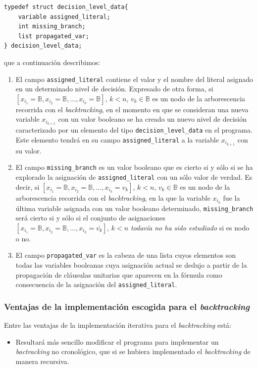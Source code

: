 \documentclass[12pt,lettersize,oneside]{article}
\begin{document}
\begin{lstlisting}
typedef struct decision_level_data{
    variable assigned_literal;
    int missing_branch;                                                
    list propagated_var;
} decision_level_data;
\end{lstlisting}
que a continuación describimos:
\vspace{-2.5mm}
\begin{enumerate}
\item El campo {\tt assigned\_literal} contiene el valor y el nombre del literal
  asignado en un determinado nivel de decisión. Expresado de otra forma,  si
  $[x_{i_1}=\mathbb{B},x_{i_2}=\mathbb{B},\ldots, x_{i_k} = \mathbb{B} ]$, $k< n$, $v_k
  \in \mathbb{B}$ es un nodo de la arborescencia recorrida con el
  \emph{backtracking}, en el momento en que se consideran una nueva variable
  $x_{i_{k+1}}$ con un valor booleano se ha creado un nuevo nivel de decisión
  caracterizado por un elemento del tipo {\tt decision\_level\_data} en el
  programa. Este elemento tendrá en su campo {\tt assigned\_literal} a la
  variable $x_{i_{k+1}}$ con su valor.
\item El campo {\tt missing\_branch} es un valor booleano que es cierto si y
  sólo si se ha explorado la asignación de {\tt assigned\_literal} con un
  sólo valor de verdad. Es decir, si
  $[x_{i_1}=\mathbb{B},x_{i_2}=\mathbb{B},\ldots, x_{i_k} = v_k ]$, $k< n$, $v_k
  \in \mathbb{B}$ es un nodo de la arborescencia recorrida con el
  \emph{backtracking}, en la que la variable $x_{i_k}$ fue la última variable
  asignada con un valor booleano determinado, {\tt missing\_branch} será cierto
  si y sólo si el conjunto de asignaciones
  $[x_{i_1}=\mathbb{B},x_{i_2}=\mathbb{B},\ldots, x_{i_k} = \overline{v_k} ]$,
  $k<n$ \emph{todavía no ha sido estudiado} si es nodo o no.
\item El campo {\tt propagated\_var} es la cabeza de una lista cuyos elementos
  son todas las variables booleanas cuya asignación actual se dedujo a partir de
  la propagación de cláusulas unitarias que aparecen en la fórmula como
  consecuencia de la asignación del {\tt assigned\_literal}.
\end{enumerate}

\subsubsection{Ventajas de la implementación escogida para el
  \emph{backtracking}}\label{VentajasBacktracking}
Entre las ventajas de la implementación iterativa para el \emph{backtracking} está:
\vspace{-2.5mm}
\begin{itemize}
  \item Resultará más sencillo modificar el programa para implementar un
    \emph{bactracking} no cronológico, que si se hubiera implementado el
    \emph{backtracking} de manera recursiva.
\end{itemize}
\end{document}
